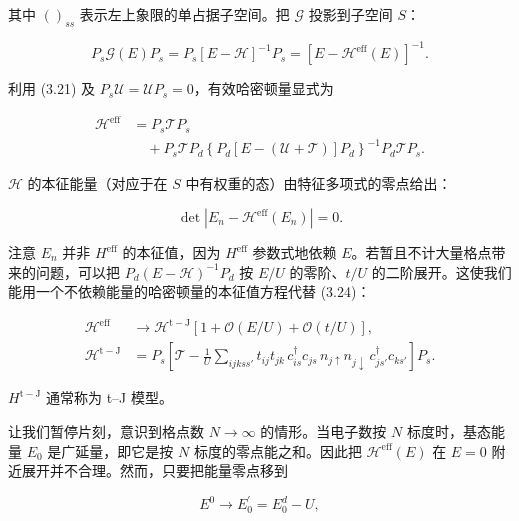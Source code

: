 其中 $()_{ss}$ 表示左上象限的单占据子空间。把 $\mathcal{G}$ 投影到子空间 $S$：

\begin{equation*}
P _ {s} \mathcal {G} (E) P _ {s} = P _ {s} \left[ E - \mathcal {H} \right] ^ {- 1} P _ {s} = \left[ E - \mathcal {H} ^ {\mathrm{eff}} (E) \right] ^ {- 1}.
\tag{3.22}
\end{equation*}

利用 (3.21) 及 $P_{s}\mathcal{U} = \mathcal{U}P_{s} = 0$，有效哈密顿量显式为

\begin{align*}
\mathcal {H} ^ {\mathrm{eff}} & = P _ {s} \mathcal {T} P _ {s}\\
& \quad + P _ {s} \mathcal {T} P _ {d} \left\{ P _ {d} \left[ E - ( \mathcal {U} + \mathcal {T} ) \right] P _ {d} \right\} ^ {- 1} P _ {d} \mathcal {T} P _ {s}.
\tag{3.23}
\end{align*}

$\mathcal{H}$ 的本征能量（对应于在 $S$ 中有权重的态）由特征多项式的零点给出：

\begin{equation*}
\det \left| E _ {n} - \mathcal {H} ^ {\mathrm{eff}} ( E _ {n} ) \right| = 0.
\tag{3.24}
\end{equation*}

注意 $E_{n}$ 并非 $H^{\mathrm{eff}}$ 的本征值，因为 $H^{\mathrm{eff}}$ 参数式地依赖 $E$。若暂且不计大量格点带来的问题，可以把 $P_{d}(E-\mathcal{H})^{-1}P_{d}$ 按 $E/U$ 的零阶、$t/U$ 的二阶展开。这使我们能用一个不依赖能量的哈密顿量的本征值方程代替 (3.24)：

\begin{align*}
\mathcal {H} ^ {\mathrm{eff}} & \rightarrow \mathcal {H} ^ {\mathrm{t-J}} \left[ 1 + \mathcal {O} ( E/U ) + \mathcal {O} ( t/U ) \right],\\
\mathcal {H} ^ {\mathrm{t-J}} & = P _ {s} \left[ \mathcal {T} - \frac {1}{U} \sum_ {ijkss'} t _ {ij} t _ {jk} \, c _ {is} ^ {\dagger} c _ {js} \, n _ {j \uparrow} n _ {j \downarrow} \, c _ {js'} ^ {\dagger} c _ {ks'} \right] P _ {s}.
\tag{3.25}
\end{align*}

$H^{\mathrm{t-J}}$ 通常称为 t--J 模型。

让我们暂停片刻，意识到格点数 $N \to \infty$ 的情形。当电子数按 $N$ 标度时，基态能量 $E_{0}$ 是广延量，即它是按 $N$ 标度的零点能之和。因此把 $\mathcal{H}^{\mathrm{eff}}(E)$ 在 $E = 0$ 附近展开并不合理。然而，只要把能量零点移到

\begin{equation*}
E ^ {0} \rightarrow E _ {0} ^ {\prime} = E _ {0} ^ {d} - U,
\tag{3.26}
\end{equation*}

